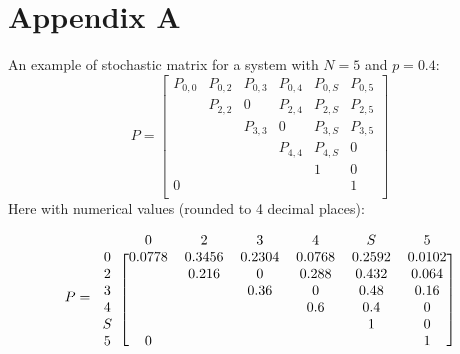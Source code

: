 \section*{Appendix A}
\label{app:a}
An example of stochastic matrix for a system with $N = 5$ and $p = 0.4$:
\begin{equation*}
P = 
\begin{bmatrix}
P_{0,0}	& P_{0,2}	& P_{0,3}  	& P_{0, 4}	& P_{0,S}	& P_{0,5} \\
		& P_{2,2}	& 0  		& P_{2, 4}	& P_{2,S}	& P_{2,5} \\
		& 			& P_{3,3}	& 0			& P_{3,S}	& P_{3,5} \\
		& 			& 			& P_{4,4}	& P_{4,S}	& 0\\
		& 			& 			& 			& 1			& 0\\
0		& 			& 		  	& 			& 			& 1\\
\end{bmatrix}
\label{exampleMatrix}
\end{equation*}
Here with numerical values (rounded to 4 decimal places):


\begin{equation*}
P=
\begin{blockarray}{ccccccc}
 & 0 & 2 & 3 & 4 & S & 5 \\
\begin{block}{c[cccccc]}
0	&	0.0778	& 0.3456	& 0.2304  	& 0.0768	& 0.2592	& 0.0102 \\
2	&			& 0.216		& 0  		&0.288		& 0.432		& 0.064 \\
3	&			& 			& 0.36		& 0			& 0.48		& 0.16 \\
4	&			& 			& 			& 0.6		& 0.4		& 0\\
S	&			& 			& 			& 			& 1			& 0\\
5	&	0		& 			& 		  	& 			& 			& 1\\
\end{block}
\end{blockarray}
\label{exampleMatrixValues}
\end{equation*}
\newpage
